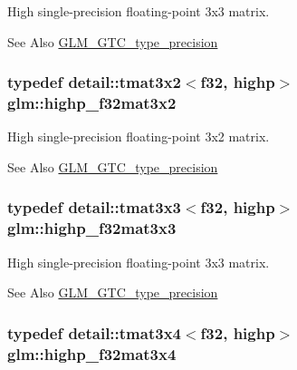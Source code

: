 High single-\/precision floating-\/point 3x3 matrix. \begin{DoxySeeAlso}{See Also}
\hyperlink{group__gtc__type__precision}{G\-L\-M\-\_\-\-G\-T\-C\-\_\-type\-\_\-precision} 
\end{DoxySeeAlso}
\hypertarget{group__gtc__type__precision_gaf36b2b34ea881977c61491b0d3b25a28}{
\subsubsection[{highp\-\_\-f32mat3x2}]{\setlength{\rightskip}{0pt plus 5cm}typedef detail\-::tmat3x2$<$f32, highp$>$ {\bf glm\-::highp\-\_\-f32mat3x2}}}\label{group__gtc__type__precision_gaf36b2b34ea881977c61491b0d3b25a28}
High single-\/precision floating-\/point 3x2 matrix. \begin{DoxySeeAlso}{See Also}
\hyperlink{group__gtc__type__precision}{G\-L\-M\-\_\-\-G\-T\-C\-\_\-type\-\_\-precision} 
\end{DoxySeeAlso}
\hypertarget{group__gtc__type__precision_ga334eca23d23aef90972fb20c5b749ca3}{
\subsubsection[{highp\-\_\-f32mat3x3}]{\setlength{\rightskip}{0pt plus 5cm}typedef detail\-::tmat3x3$<$f32, highp$>$ {\bf glm\-::highp\-\_\-f32mat3x3}}}\label{group__gtc__type__precision_ga334eca23d23aef90972fb20c5b749ca3}
High single-\/precision floating-\/point 3x3 matrix. \begin{DoxySeeAlso}{See Also}
\hyperlink{group__gtc__type__precision}{G\-L\-M\-\_\-\-G\-T\-C\-\_\-type\-\_\-precision} 
\end{DoxySeeAlso}
\hypertarget{group__gtc__type__precision_gaa71f504ecb02f9178026b01013b77ba0}{
\subsubsection[{highp\-\_\-f32mat3x4}]{\setlength{\rightskip}{0pt plus 5cm}typedef detail\-::tmat3x4$<$f32, highp$>$ {\bf glm\-::highp\-\_\-f32mat3x4}}}\label{group__gtc__type__precision_gaa71f504ecb02f9178026b01013b77ba0}
